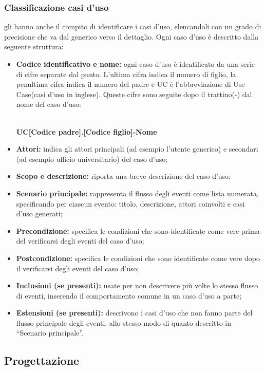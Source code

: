 \documentclass[NormeDiProgetto.tex]{subfiles}
\begin{document}
\subsubsection{Classificazione casi d'uso} gli \anali{} hanno anche il compito di identificare i casi d’uso, elencandoli con un grado di precisione che va dal generico verso il dettaglio. Ogni caso d’uso è descritto dalla seguente struttura:\\
\begin{itemize}
	\item \textbf{Codice identificativo e nome:} ogni caso d'uso è identificato da una serie di cifre separate dal punto. L'ultima cifra indica il numero di figlio, la penultima cifra indica il numero del padre e UC è l'abbreviazione di Use Case(casi d'uso in inglese). Queste cifre sono seguite dopo il trattino(-) dal nome del caso d'uso: \\\\
	\centerline{\textbf{UC[Codice padre].[Codice figlio]-Nome}}
	\item \textbf{Attori:} indica gli attori principali (ad esempio l’utente generico) e
	secondari (ad esempio ufficio universitario) del caso d’uso;
	\item \textbf{Scopo e descrizione:} riporta una breve descrizione del caso d’uso;
	\item \textbf{Scenario principale:} rappresenta il flusso degli eventi come lista
	numerata, specificando per ciascun evento: titolo, descrizione, attori
	coinvolti e casi d’uso generati;
	\item \textbf{Precondizione:} specifica le condizioni che sono identificate come vere
	prima del verificarsi degli eventi del caso d’uso;
	\item \textbf{Postcondizione:} specifica le condizioni che sono identificate come
	vere dopo il verificarsi degli eventi del caso d’uso;
	\item \textbf{Inclusioni (se presenti):} usate per non descrivere più volte lo stesso flusso di eventi,
	inserendo il comportamento comune in un caso d’uso a parte;
	\item \textbf{Estensioni (se presenti):} descrivono i casi d’uso che non fanno parte del flusso
	principale degli eventi, allo stesso modo di quanto descritto in “Scenario
	principale”.
\end{itemize}

\subsection{Progettazione}
\end{document}
